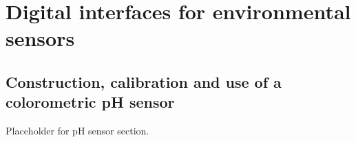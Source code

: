 \setchapterpreamble[u]{\margintoc}
\chapter{Digital interfaces for environmental sensors}


\section{Construction, calibration and use of a colorometric pH sensor}
Placeholder for pH sensor section.
